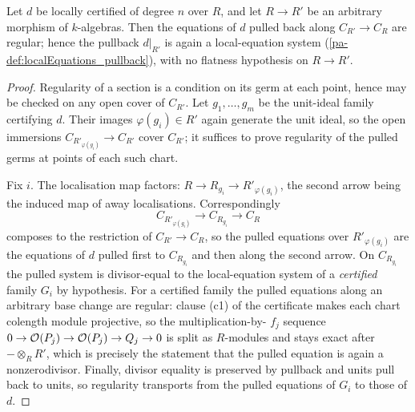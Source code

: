 \begin{theorem}
  \label{pa-thm:isLocallyCertified_pullback_regular}
  \leanok

  Let \(d\) be locally certified of degree \(n\) over \(R\), and let \(R \to R'\) be an
  arbitrary morphism of \(k\)-algebras. Then the equations of \(d\) pulled back along
  \(C_{R'} \to C_R\) are regular; hence the pullback \(d|_{R'}\) is again a local-equation
  system (\ref{pa-def:localEquations_pullback}), with no flatness hypothesis on \(R \to R'\).
\end{theorem}
\begin{proof}
  \leanok
  Regularity of a section is a condition on its germ at each point, hence may be checked on
  any open cover of \(C_{R'}\). Let \(g_1,\dots,g_m\) be the unit-ideal family certifying
  \(d\). Their images \(\varphi(g_i) \in R'\) again generate the unit ideal, so the open
  immersions \(C_{R'_{\varphi(g_i)}} \to C_{R'}\) cover \(C_{R'}\); it suffices to prove
  regularity of the pulled germs at points of each such chart.

  Fix \(i\). The localisation map factors: \(R \to R_{g_i} \to R'_{\varphi(g_i)}\), the
  second arrow being the induced map of away localisations. Correspondingly
  \[
    C_{R'_{\varphi(g_i)}} \longrightarrow C_{R_{g_i}} \longrightarrow C_R
  \]
  composes to the restriction of \(C_{R'} \to C_R\), so the pulled equations over
  \(R'_{\varphi(g_i)}\) are the equations of \(d\) pulled first to \(C_{R_{g_i}}\) and then
  along the second arrow. On \(C_{R_{g_i}}\) the pulled system is divisor-equal to the
  local-equation system of a \emph{certified} family \(G_i\) by hypothesis. For a certified
  family the pulled equations along an arbitrary base change are regular: clause (c1) of
  the certificate makes each chart colength module projective, so the multiplication-by-
  \(f_j\) sequence \(0 \to \mathcal{O}_{}(P_j) \to \mathcal{O}_{}(P_j) \to Q_j \to 0\) is split as
  \(R\)-modules and stays exact after \(- \otimes_R R'\), which is precisely the statement
  that the pulled equation is again a nonzerodivisor. Finally, divisor equality is
  preserved by pullback and units pull back to units, so regularity transports from the
  pulled equations of \(G_i\) to those of \(d\).
\end{proof}

